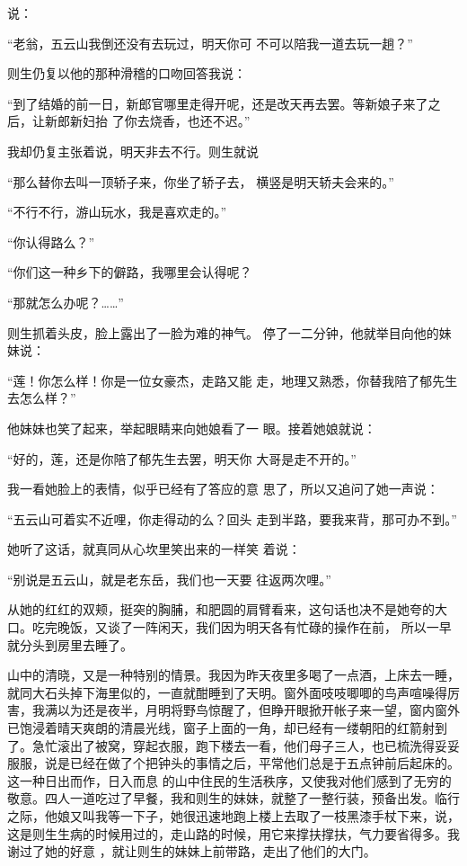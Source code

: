 \documentclass{article}
\begin{document}
说： 

“老翁，五云山我倒还没有去玩过，明天你可
不可以陪我一道去玩一趟？” 


则生仍复以他的那种滑稽的口吻回答我说： 

“到了结婚的前一日，新郎官哪里走得开呢，还是改天再去罢。等新娘子来了之后，让新郎新妇抬
了你去烧香，也还不迟。” 

我却仍复主张着说，明天非去不行。则生就说

“那么替你去叫一顶轿子来，你坐了轿子去，
横竖是明天轿夫会来的。” 


“不行不行，游山玩水，我是喜欢走的。” 


“你认得路么？” 

“你们这一种乡下的僻路，我哪里会认得呢？
\newpage



“那就怎么办呢？……” 

则生抓着头皮，脸上露出了一脸为难的神气。
停了一二分钟，他就举目向他的妹妹说： 

“莲！你怎么样！你是一位女豪杰，走路又能
走，地理又熟悉，你替我陪了郁先生去怎么样？” 

他妹妹也笑了起来，举起眼睛来向她娘看了一
眼。接着她娘就说： 

“好的，莲，还是你陪了郁先生去罢，明天你
大哥是走不开的。” 

我一看她脸上的表情，似乎已经有了答应的意
思了，所以又追问了她一声说： 

“五云山可着实不近哩，你走得动的么？回头
走到半路，要我来背，那可办不到。” 

\newpage

她听了这话，就真同从心坎里笑出来的一样笑
着说： 

“别说是五云山，就是老东岳，我们也一天要
往返两次哩。” 

从她的红红的双颊，挺突的胸脯，和肥圆的肩臂看来，这句话也决不是她夸的大口。吃完晚饭，又谈了一阵闲天，我们因为明天各有忙碌的操作在前，
所以一早就分头到房里去睡了。 

山中的清晓，又是一种特别的情景。我因为昨天夜里多喝了一点酒，上床去一睡，就同大石头掉下海里似的，一直就酣睡到了天明。窗外面吱吱唧唧的鸟声喧噪得厉害，我满以为还是夜半，月明将野鸟惊醒了，但睁开眼掀开帐子来一望，窗内窗外已饱浸着晴天爽朗的清晨光线，窗子上面的一角，却已经有一缕朝阳的红箭射到了。急忙滚出了被窝，穿起衣服，跑下楼去一看，他们母子三人，也已梳洗得妥妥服服，说是已经在做了个把钟头的事情之后，平常他们总是于五点钟前后起床的。这一种日出而作，日入而息
\newpage
的山中住民的生活秩序，又使我对他们感到了无穷的敬意。四人一道吃过了早餐，我和则生的妹妹，就整了一整行装，预备出发。临行之际，他娘又叫我等一下子，她很迅速地跑上楼上去取了一枝黑漆手杖下来，说，这是则生生病的时候用过的，走山路的时候，用它来撑扶撑扶，气力要省得多。我谢过了她的好意
，就让则生的妹妹上前带路，走出了他们的大门。 
\end{document}
